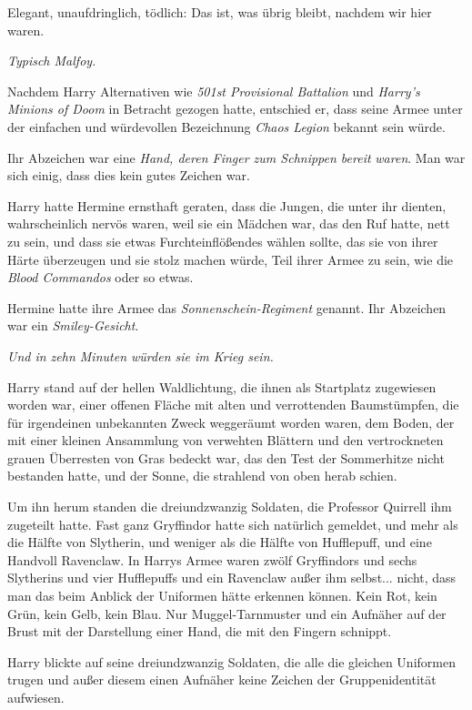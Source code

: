 Elegant, unaufdringlich, tödlich: Das ist, was übrig bleibt, nachdem wir hier
waren.

\emph{Typisch Malfoy.}

Nachdem Harry Alternativen wie \emph{501st Provisional Battalion} und
\emph{Harry's Minions of Doom} in Betracht gezogen hatte, entschied er, dass
seine Armee unter der einfachen und würdevollen Bezeichnung \emph{Chaos Legion}
bekannt sein würde.

Ihr Abzeichen war eine \emph{Hand, deren Finger zum Schnippen bereit}
\emph{waren}. Man war sich einig, dass dies kein gutes Zeichen war.

Harry hatte Hermine ernsthaft geraten, dass die Jungen, die unter ihr dienten,
wahrscheinlich nervös waren, weil sie ein Mädchen war, das den Ruf hatte, nett
zu sein, und dass sie etwas Furchteinflößendes wählen sollte, das sie von ihrer
Härte überzeugen und sie stolz machen würde, Teil ihrer Armee zu sein, wie die
\emph{Blood Commandos} oder so etwas.

Hermine hatte ihre Armee das \emph{Sonnenschein-Regiment} genannt. Ihr Abzeichen
war ein \emph{Smiley-Gesicht}.

\emph{Und in zehn Minuten würden sie im Krieg sein.}

Harry stand auf der hellen Waldlichtung, die ihnen als Startplatz zugewiesen
worden war, einer offenen Fläche mit alten und verrottenden Baumstümpfen, die
für irgendeinen unbekannten Zweck weggeräumt worden waren, dem Boden, der mit
einer kleinen Ansammlung von verwehten Blättern und den vertrockneten grauen
Überresten von Gras bedeckt war, das den Test der Sommerhitze nicht bestanden
hatte, und der Sonne, die strahlend von oben herab schien.

Um ihn herum standen die dreiundzwanzig Soldaten, die Professor Quirrell ihm
zugeteilt hatte. Fast ganz Gryffindor hatte sich natürlich gemeldet, und mehr
als die Hälfte von Slytherin, und weniger als die Hälfte von Hufflepuff, und
eine Handvoll Ravenclaw. In Harrys Armee waren zwölf Gryffindors und sechs
Slytherins und vier Hufflepuffs und ein Ravenclaw außer ihm selbst... nicht,
dass man das beim Anblick der Uniformen hätte erkennen können. Kein Rot, kein
Grün, kein Gelb, kein Blau. Nur Muggel-Tarnmuster und ein Aufnäher auf der Brust
mit der Darstellung einer Hand, die mit den Fingern schnippt.

Harry blickte auf seine dreiundzwanzig Soldaten, die alle die gleichen Uniformen
trugen und außer diesem einen Aufnäher keine Zeichen der Gruppenidentität
aufwiesen.

